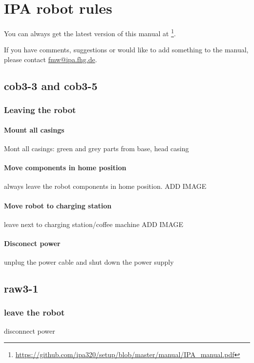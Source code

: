 \chapter{IPA robot rules}
\label{chap:robot-rules} 
You can always get the latest version of this manual at \footnote{\url{https://github.com/ipa320/setup/blob/master/manual/IPA_manual.pdf}}.

If you have comments, suggestions or would like to add something to the manual, please contact \href{mailto:fmw@ipa.fhg.de}{fmw@ipa.fhg.de}.

\section{cob3-3 and cob3-5}
\subsection{Leaving the robot}
\subsubsection{Mount all casings}
Mont all casings: green and grey parts from base, head casing
\subsubsection{Move components in home position}
always leave the robot components in home position. ADD IMAGE

\subsubsection{Move robot to charging station}
leave next to charging station/coffee machine ADD IMAGE

\subsubsection{Disconect power}
unplug the power cable and shut down the power supply

\section{raw3-1}
\subsection{leave the robot}

disconnect power